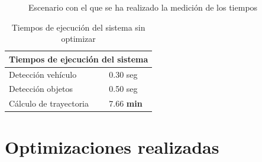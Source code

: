 \begin{figure}[htbp]
 \centering
 \caption{Escenario con el que se ha realizado la medición de los tiempos}
 \label{fig:EscenarioPruebaFinal}
\end{figure}


\begin{table}[hbtp]
\centering
\begin{tabular}{|l|l|}
\hline
\multicolumn{2}{|c|}{\cellcolor[HTML]{9B9B9B}Tiempos de ejecución del sistema} \\ \hline
Detección vehículo                           & 0.30 seg                      \\ \hline
Detección objetos                            & 0.50 seg                      \\ \hline
Cálculo de trayectoria                       & 7.66 \textbf{min}             \\ \hline
\end{tabular}
\caption {Tiempos de ejecución del sistema sin optimizar}
\label{tab:TiempoEjecucionSistemaMalo}
\end{table}
 

\section{Optimizaciones realizadas}

